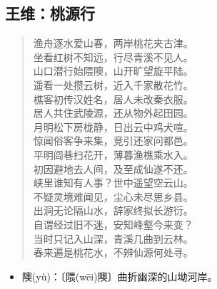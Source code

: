 \documentclass[12pt,oneside]{book}
\newenvironment{shici}{%
\begin{verse}\centering\yanti\large\hspace{12pt}}{\end{verse}}
\begin{document}
\begin{common-format}
\chapter{王维：桃源行}
\begin{shici}
渔舟逐水爱山春，两岸桃花夹古津。\\
坐看红树不知远，行尽青溪不见人。\\
山口潜行始隈隩，山开旷望旋平陆。\\
遥看一处攒云树，近入千家散花竹。\\
樵客初传汉姓名，居人未改秦衣服。\\
居人共住武陵源，还从物外起田园。\\
月明松下房栊静，日出云中鸡犬喧。\\
惊闻俗客争来集，竞引还家问都邑。\\
平明闾巷扫花开，薄暮渔樵乘水入。\\
初因避地去人间，及至成仙遂不还。\\
峡里谁知有人事？世中遥望空云山。\\
不疑灵境难闻见，尘心未尽思乡县。\\
出洞无论隔山水，辞家终拟长游衍。\\
自谓经过旧不迷，安知峰壑今来变？\\
当时只记入山深，青溪几曲到云林。\\
春来遍是桃花水，不辨仙源何处寻。
\end{shici}

\begin{itemize}
\item 隩(yù)：〔隈(wēi)隩〕曲折幽深的山坳河岸。
\end{itemize}


\end{common-format}
\end{document}
